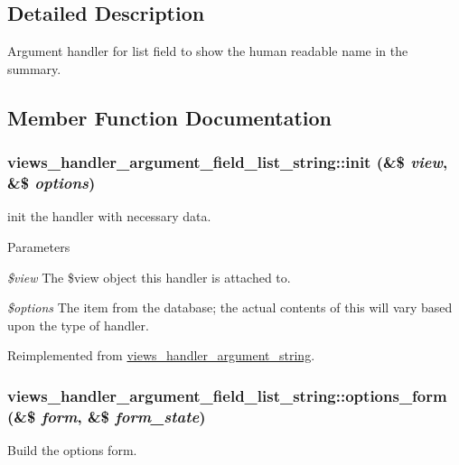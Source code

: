 \subsection{Detailed Description}
Argument handler for list field to show the human readable name in the summary. 

\subsection{Member Function Documentation}
\hypertarget{classviews__handler__argument__field__list__string_a3f56fc3681ce2363758ab69821b74885}{
\subsubsection[{init}]{\setlength{\rightskip}{0pt plus 5cm}views\_\-handler\_\-argument\_\-field\_\-list\_\-string::init (\&\$ {\em view}, \/  \&\$ {\em options})}}
\label{classviews__handler__argument__field__list__string_a3f56fc3681ce2363758ab69821b74885}
init the handler with necessary data. 
\begin{DoxyParams}{Parameters}
\item[{\em \$view}]The \$view object this handler is attached to. \item[{\em \$options}]The item from the database; the actual contents of this will vary based upon the type of handler. \end{DoxyParams}


Reimplemented from \hyperlink{classviews__handler__argument__string_a504dc70451721c2b9ccae44240d13e2e}{views\_\-handler\_\-argument\_\-string}.\hypertarget{classviews__handler__argument__field__list__string_a4e4a9d1fc93be565b57059152d21ae03}{
\subsubsection[{options\_\-form}]{\setlength{\rightskip}{0pt plus 5cm}views\_\-handler\_\-argument\_\-field\_\-list\_\-string::options\_\-form (\&\$ {\em form}, \/  \&\$ {\em form\_\-state})}}
\label{classviews__handler__argument__field__list__string_a4e4a9d1fc93be565b57059152d21ae03}
Build the options form. 

